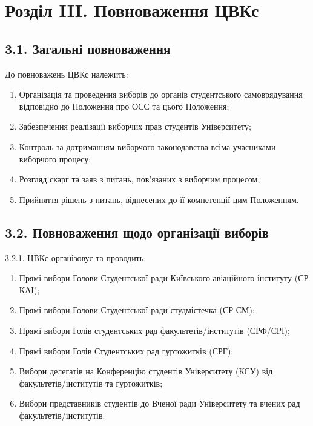 \section*{Розділ III. Повноваження ЦВКс}

\subsection*{3.1. Загальні повноваження}
    До повноважень ЦВКс належить:
        \begin{enumerate}[label=\alph*)]
            \item Організація та проведення виборів до органів студентського самоврядування відповідно до Положення про ОСС та цього Положення;
            \item Забезпечення реалізації виборчих прав студентів Університету;
            \item Контроль за дотриманням виборчого законодавства всіма учасниками виборчого процесу;
            \item Розгляд скарг та заяв з питань, пов'язаних з виборчим процесом;
            \item Прийняття рішень з питань, віднесених до її компетенції цим Положенням.
        \end{enumerate}

\subsection*{3.2. Повноваження щодо організації виборів}
    3.2.1. ЦВКс організовує та проводить:

        \begin{enumerate}[label=\alph*)]
            \item Прямі вибори Голови Студентської ради Київського авіаційного інституту (СР КАІ);
            \item Прямі вибори Голови Студентської ради студмістечка (СР СМ);
            \item Прямі вибори Голів студентських рад факультетів/інститутів (СРФ/СРІ);
            \item Прямі вибори Голів Студентських рад гуртожитків (СРГ);
            \item Вибори делегатів на Конференцію студентів Університету (КСУ) від факультетів/інститутів та гуртожитків;
            \item Вибори представників студентів до Вченої ради Університету та вчених рад факультетів/інститутів.
        \end{enumerate}

